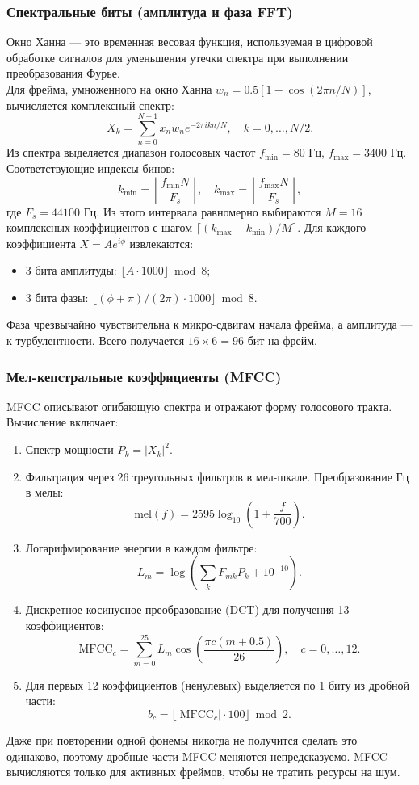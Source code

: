 \documentclass[14pt, a4paper]{extreport}
\begin{document}
\subsubsection{Спектральные биты (амплитуда и фаза FFT)}
Окно Ханна — это временная весовая функция, используемая в цифровой обработке сигналов для уменьшения утечки спектра при выполнении преобразования Фурье. \\
Для фрейма, умноженного на окно Ханна $w_n = 0.5[1-\cos(2\pi n / N)]$, вычисляется комплексный спектр:
\[
X_k = \sum_{n=0}^{N-1} x_n w_n e^{-2\pi i k n / N}, \quad k = 0,\dots,N/2.
\]
Из спектра выделяется диапазон голосовых частот $f_{\min}=80$ Гц, $f_{\max}=3400$ Гц. Соответствующие индексы бинов:
\[
k_{\min} = \left\lfloor \frac{f_{\min} N}{F_s} \right\rfloor,\quad k_{\max} = \left\lfloor \frac{f_{\max} N}{F_s} \right\rfloor,
\]
где $F_s = 44100$ Гц. Из этого интервала равномерно выбираются $M = 16$ комплексных коэффициентов с шагом $\lceil (k_{\max}-k_{\min}) / M \rceil$. Для каждого коэффициента $X = A e^{i\phi}$ извлекаются:
\begin{itemize}
    \item 3 бита амплитуды: $\lfloor A \cdot 1000 \rfloor \bmod 8$;
    \item 3 бита фазы: $\bigl\lfloor (\phi + \pi) / (2\pi) \cdot 1000 \bigr\rfloor \bmod 8$.
\end{itemize}
Фаза чрезвычайно чувствительна к микро-сдвигам начала фрейма, а амплитуда — к турбулентности. Всего получается $16 \times 6 = 96$ бит на фрейм.

\subsubsection{Мел-кепстральные коэффициенты (MFCC)}

MFCC описывают огибающую спектра и отражают форму голосового тракта. Вычисление включает:
\begin{enumerate}
    \item Спектр мощности $P_k = |X_k|^2$.
    \item Фильтрация через 26 треугольных фильтров в мел-шкале. Преобразование Гц в мелы:
    \[
    \mathrm{mel}(f) = 2595 \log_{10}\!\left(1 + \frac{f}{700}\right).
    \]
    \item Логарифмирование энергии в каждом фильтре:
    \[
    L_m = \log\left(\sum_{k} F_{mk} P_k + 10^{-10}\right).
    \]
    \item Дискретное косинусное преобразование (DCT) для получения 13 коэффициентов:
    \[
    \mathrm{MFCC}_c = \sum_{m=0}^{25} L_m \cos\!\left(\frac{\pi c (m+0.5)}{26}\right),\quad c=0,\dots,12.
    \]
    \item Для первых 12 коэффициентов (ненулевых) выделяется по 1 биту из дробной части:
    \[
    b_c = \lfloor |\mathrm{MFCC}_c| \cdot 100 \rfloor \bmod 2.
    \]
\end{enumerate}
Даже при повторении одной фонемы никогда не получится сделать это одинаково, поэтому дробные части MFCC меняются непредсказуемо. MFCC вычисляются только для активных фреймов, чтобы не тратить ресурсы на шум.
\end{document}
